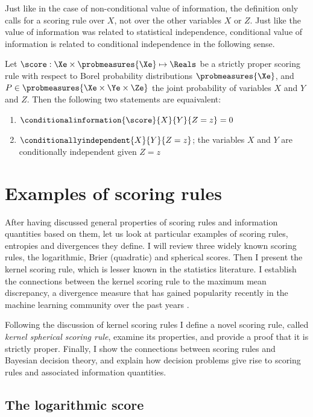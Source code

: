 Just like in the case of non-conditional value of information, the definition only calls for a scoring rule over $X$, not over the other variables $X$ or $Z$. Just like the value of information was related to statistical independence, conditional value of information is related to conditional independence in the following sense.

\begin{statement}
	Let $\score:\Xe\times\probmeasures{\Xe}\mapsto\Reals$ be a strictly proper scoring rule with respect to Borel probability distributions $\probmeasures{\Xe}$, and $P\in\probmeasures{\Xe\times\Ye\times\Ze}$ the joint probability of variables $X$ and $Y$ and $Z$. Then the following two statements are equaivalent:
	\begin{enumerate}
		\item $\conditionalinformation{\score}{X}{Y}{Z=z} = 0$
		\item $\conditionallyindependent{X}{Y}{Z=z}$; the variables $X$ and $Y$ are conditionally independent given $Z=z$
	\end{enumerate}
\end{statement}


\section{Examples of scoring rules}

After having discussed general properties of scoring rules and information quantities based on them, let us look at particular examples of scoring rules, entropies and divergences they define. I will review three widely known scoring rules, the logarithmic, Brier (quadratic) and spherical scores. Then I present the kernel scoring rule, which is lesser known in the statistics literature. I establish the connections between the kernel scoring rule to the maximum mean discrepancy, a divergence measure that has gained popularity recently in the machine learning community over the past years \citep{Gretton2012,Sriperumbudur2008}.

Following the discussion of kernel scoring rules I define a novel scoring rule, called \emph{kernel spherical scoring rule}, examine its properties, and provide a proof that it is strictly proper. Finally, I show the connections between scoring rules and Bayesian decision theory, and explain how decision problems give rise to scoring rules and associated information quantities.

\subsection{The logarithmic score\label{sec:log_score}}

